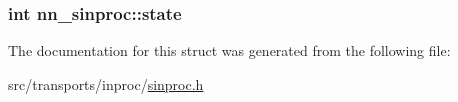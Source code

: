 \subsubsection[{state}]{\setlength{\rightskip}{0pt plus 5cm}int nn\+\_\+sinproc\+::state}\hypertarget{structnn__sinproc_a4e706c4229c2a6744caa694b4c3d180f}{}\label{structnn__sinproc_a4e706c4229c2a6744caa694b4c3d180f}


The documentation for this struct was generated from the following file\+:\begin{DoxyCompactItemize}
\item 
src/transports/inproc/\hyperlink{sinproc_8h}{sinproc.\+h}\end{DoxyCompactItemize}
